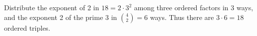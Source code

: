 Distribute the exponent of 2 in $18=2\cdot3^2$ among three ordered factors in 3 ways, and the exponent 2 of the prime 3 in $\binom42=6$ ways. Thus there are $3\cdot6=\boxed{18}$ ordered triples.
